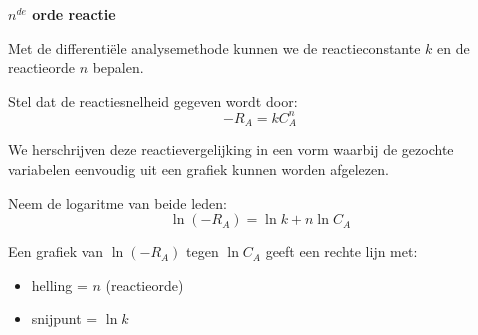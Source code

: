\documentclass{ximera}
\begin{document}
\begin{example} \textbf{$n^{de}$ orde reactie}

Met de differentiële analysemethode kunnen we de reactieconstante $k$ en de reactieorde $n$ bepalen. 

Stel dat de reactiesnelheid gegeven wordt door:
\[
-R_A = k C_A^n
\]

We herschrijven deze reactievergelijking in een vorm waarbij de gezochte variabelen eenvoudig uit een grafiek kunnen worden afgelezen.

Neem de logaritme van beide leden:
\[
\ln(-R_A) = \ln k + n \ln C_A
\]

Een grafiek van $\ln(-R_A)$ tegen $\ln C_A$ geeft een rechte lijn met:
\begin{itemize}
\item helling = $n$ (reactieorde)
\item snijpunt = $\ln k$
\end{itemize}


\end{example}
\end{document}

